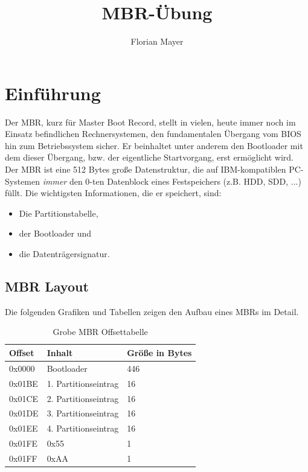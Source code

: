 \documentclass[11pt,a4paper]{article}
\begin{document}
\title{\color{black} MBR-Übung}
\author{\color{darkblue} Florian Mayer}
\maketitle

\tableofcontents

\section{Einführung}
Der MBR, kurz für Master Boot Record, stellt in vielen, heute
immer noch im Einsatz befindlichen Rechnersystemen, den fundamentalen
Übergang vom BIOS hin zum Betriebssystem sicher. Er beinhaltet unter anderem
den Bootloader mit dem dieser Übergang, bzw. der eigentliche Startvorgang,
erst ermöglicht wird. Der MBR ist eine 512 Bytes
große Datenstruktur, die auf IBM-kompatiblen PC-Systemen \emph{immer}
den 0-ten Datenblock eines Festspeichers (z.B. HDD, SDD, ...) füllt.
Die wichtigsten Informationen, die er speichert, sind:
\begin{itemize}
	\item Die Partitionstabelle,
	\item der Bootloader und
	\item die Datenträgersignatur.
\end{itemize}

\subsection{MBR Layout}
Die folgenden Grafiken und Tabellen zeigen den Aufbau eines MBRs im Detail.

\begin{table}[h]
	\begin{center}
		
		\begin{tabular}[c]{  l | l | l }
		\cellcolor{grey} Offset & \cellcolor{grey} Inhalt & \cellcolor{grey} Größe in Bytes \\ \hline
		0x0000 & Bootloader & 446\\ \hline
		0x01BE & 1. Partitionseintrag & 16 \\ \hline
		0x01CE & 2. Partitionseintrag & 16 \\ \hline
		0x01DE & 3. Partitionseintrag & 16 \\ \hline
		0x01EE & 4. Partitionseintrag & 16 \\ \hline
		0x01FE & 0x55 & 1\\ \hline
		0x01FF & 0xAA & 1\\
		\end{tabular}
	\end{center}
	
	\caption{Grobe MBR Offsettabelle}
	\label{tab:mbr_layout_tbl}
\end{table}
\end{document}
